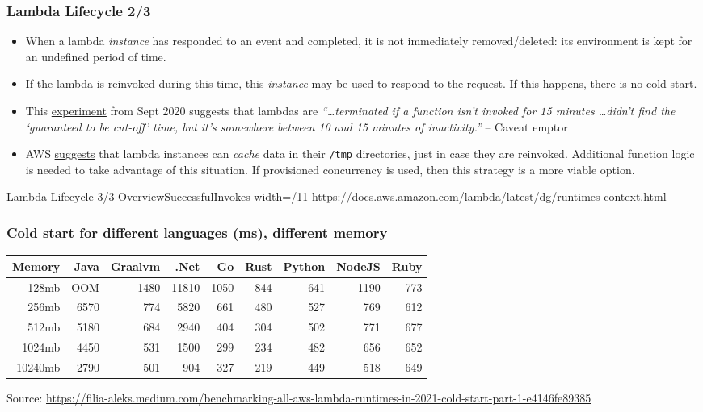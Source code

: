 \documentclass[11pt,aspectratio=169]{beamer}
\begin{document}
\begin{nrcanFrame}
  \frametitle{Lambda Lifecycle 2/3}
  \begin{itemize}
    \item When a lambda \textit{instance} has responded to an event and completed, it is \alert{not immediately removed/deleted}:
  its environment is kept for an undefined period of time.
\item If the lambda is reinvoked during this time, this \textit{instance} may be used to respond to the request.
  \alert{If this happens, there is no cold start}.
\item This
  \href{https://xebia.com/blog/til-that-aws-lambda-terminates-instances-preemptively/}{experiment}
  from Sept 2020 suggests that lambdas are
  \textit{``\dots terminated
    if a  function isn’t invoked for 15 minutes \ldots didn’t find the
    ‘guaranteed to be cut-off’ time, but it’s somewhere between 10 and
    15 minutes of inactivity.''} -- Caveat emptor
\item 
  AWS
  \href{https://docs.aws.amazon.com/lambda/latest/dg/runtimes-context.html\#runtimes-lifecycle-shutdown}{suggests}
  that lambda instances can \textit{cache} data in their \texttt{/tmp} directories, just in case they are reinvoked.
  Additional function logic is needed to take advantage of this situation.
  If provisioned concurrency is used, then this strategy is a more
  viable option.
  \end{itemize}
\end{nrcanFrame}

\nrcanGraphicFrame
  {Lambda Lifecycle 3/3}
  {OverviewSuccessfulInvokes}
  {width=/11}
  {https://docs.aws.amazon.com/lambda/latest/dg/runtimes-context.html}



\begin{nrcanFrame}
  \frametitle{Cold start for different languages (ms), different memory}
  \centering
  \begin{table}
  \begin{tabular}{|r||r|r|r|r|r|r|r|r|}\hline    \hline
    \bf Memory      &\bf Java 	&\bf Graalvm& \bf .Net &	\bf Go& 	\bf Rust& 	\bf Python& 	\bf NodeJS& 	\bf Ruby\\ \hline
    128mb 	&OOM 	&1480 &	  11810 &	1050 &	844 &	641 &	        1190 &	773\\ \hline
    256mb 	&6570 &	774 &	  5820 &	661 &	480 &	527 &	        769 &	612\\ \hline
    512mb 	&5180 &	684 &	  2940 &	404 &	304 &	502 &	        771 &	677\\ \hline
    1024mb 	&4450 &	531 &	  1500 &	299 &	234 &	482 &	        656 &	652\\ \hline
    10240mb     &2790 &	501 &	  904 &	        327 &	219 &	449 &	        518 &	649\\ \hline
      \hline 
  \end{tabular}
  \end{table}

  {\tiny Source: \url{https://filia-aleks.medium.com/benchmarking-all-aws-lambda-runtimes-in-2021-cold-start-part-1-e4146fe89385}}
\end{nrcanFrame}
\end{document}
